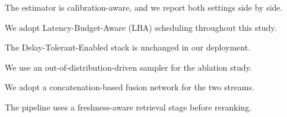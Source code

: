 
The estimator is calibration-aware, and we report both settings side by side.

We adopt Latency-Budget-Aware (LBA) scheduling throughout this study.

The Delay-Tolerant-Enabled stack is unchanged in our deployment.

We use an out-of-distribution-driven sampler for the ablation study.


We adopt a concatenation-based fusion network for the two streams.

The pipeline uses a freshness-aware retrieval stage before reranking.
